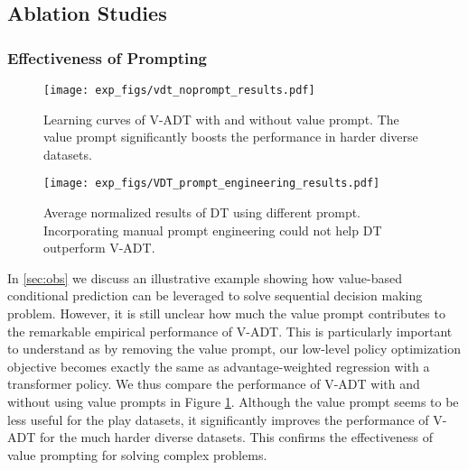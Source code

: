 \iffalse
An integration of findings from Table \ref{exp:main_results_value} and \ref{exp:main_results_goal} further suggests that goal prompts might possess a comparative advantage over value prompts. One plausible explanation is that goal prompts assist in simplifying policy training by decomposing intricate tasks into manageable subtasks. Conversely, while value prompt might attempt to stitch sub-optimal trajectories, it primary focus on the overarching task. Anyhow, as both V-ADT and G-ADT outperforms DT, we can conclude that with appropriately crafted prompts and corresponding training regime as does in ADT, the capabilities of DT can be more effectively exploited to achieve better performance. 
\fi





\subsection{Ablation Studies}
\label{sec:ablations}

\subsubsection{Effectiveness of Prompting}
\label{sec:manual_prompt}


\begin{figure}[!htbp]
\centering
\texttt{[image: exp\_figs/vdt\_noprompt\_results.pdf]}
\caption{Learning curves of V-ADT with and without value prompt. The value prompt significantly boosts the performance in harder diverse datasets.}
\label{fig:prompt_ablation}
\end{figure}%

\begin{figure}[!htbp]
\centering
\texttt{[image: exp\_figs/VDT\_prompt\_engineering\_results.pdf]}
\caption{Average normalized results of DT using different prompt. Incorporating manual prompt engineering could not help DT outperform V-ADT. }
\label{fig:manual_prompt}
\end{figure}%


In \cref{sec:obs} we discuss an illustrative example showing how value-based conditional prediction can be leveraged to solve sequential decision making problem. 
However, it is still unclear how much the value prompt contributes to the remarkable empirical performance of V-ADT. 
This is particularly important to understand as by removing the value prompt, our low-level policy optimization objective  becomes exactly the same as {advantage-weighted regression} \citep{peng2019advantage} with a transformer policy. 
We thus compare the performance of V-ADT with and without using value prompts in Figure \ref{fig:prompt_ablation}.  
Although the value prompt seems to be less useful for the play datasets, it significantly improves the performance of V-ADT for the much harder diverse datasets. This confirms the effectiveness of value prompting for solving complex problems. 

